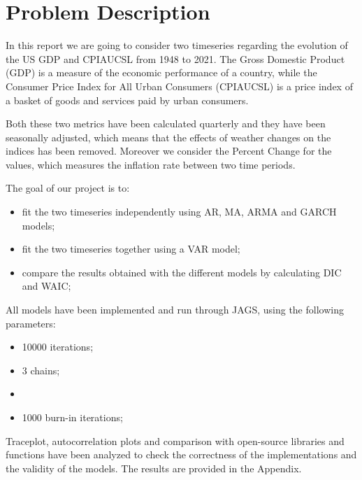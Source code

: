 \section{Problem Description}
In this report we are going to consider two timeseries regarding the evolution of the US GDP and CPIAUCSL from 1948 to 2021.
The Gross Domestic Product (GDP) is a measure of the economic performance of a country, while the Consumer Price Index for All Urban Consumers (CPIAUCSL) is a price index of a basket of goods and services paid by urban consumers.

Both these two metrics have been calculated quarterly and they have been seasonally adjusted, which means that the effects of weather changes on the indices has been removed. Moreover we consider the Percent Change for the values, which measures the inflation rate between two time periods.

The goal of our project is to:
\begin{itemize}
    \item fit the two timeseries independently using AR, MA, ARMA and GARCH models;
    \item fit the two timeseries together using a VAR model;
    \item compare the results obtained with the different models by calculating DIC and WAIC;
\end{itemize}
All models have been implemented and run through JAGS, using the following parameters:
\begin{itemize}
    \item 10000 iterations;
    \item 3 chains;
    \item \item 1000 burn-in iterations;
\end{itemize}
Traceplot, autocorrelation plots and comparison with open-source libraries and functions have been analyzed to check the correctness of the implementations and the validity of the models.
The results are provided in the Appendix.